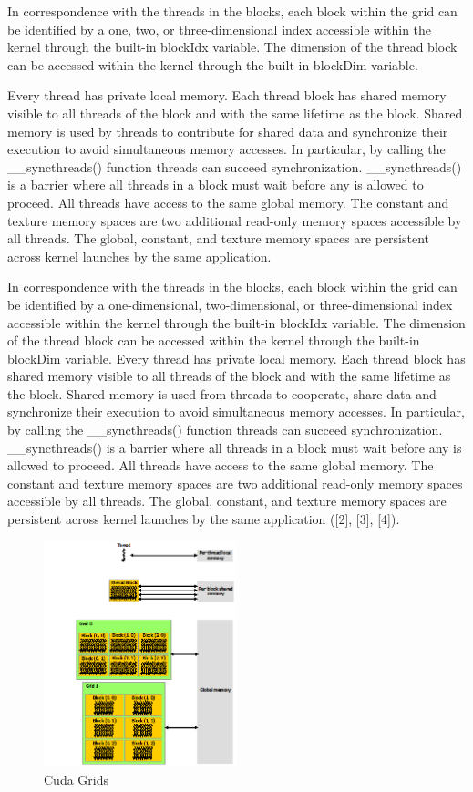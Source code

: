 In correspondence with the threads in the blocks, each block within the grid can be identified by a one, two, or three-dimensional index accessible within the kernel through the built-in blockIdx variable. The dimension of the thread block can be accessed within the kernel through the built-in blockDim variable. 

Every thread has private local memory. Each thread block has shared memory visible to all threads of the block and with the same lifetime as the block. Shared memory is used by threads to contribute for shared data and synchronize their execution to avoid simultaneous memory accesses. In particular, by calling the \_\_syncthreads() function threads can succeed synchronization.  \_\_syncthreads() is a barrier where all threads in a block must wait before any is allowed to proceed. All threads have access to the same global memory. The constant and texture memory spaces are two additional read-only memory spaces accessible by all threads. The global, constant, and texture memory spaces are persistent across kernel launches by the same application. 


In correspondence with the threads in the blocks, each block within the grid can be identified by a one-dimensional, two-dimensional, or three-dimensional index accessible within the kernel through the built-in blockIdx variable. The dimension of the thread block can be accessed within the kernel through the built-in blockDim variable. Every thread has private local memory. Each thread block has shared memory visible to all threads of the block and with the same lifetime as the block. Shared memory is used from threads to cooperate, share data and synchronize their execution to avoid simultaneous memory accesses. In particular, by calling the \_\_syncthreads() function threads can succeed  synchronization. \_\_syncthreads() is a barrier where all threads in a block must wait before any is allowed to proceed. All threads have access to the same global memory. The constant and texture memory spaces are two additional read-only memory spaces accessible by all threads. The global, constant, and texture memory spaces are persistent across kernel launches by the same application ([2], [3], [4]). 

\begin{figure}[H]
   \centering
       \includegraphics[width=0.5\textwidth]{grids}
   \caption{Cuda Grids}
   \label{fig:Grids}
\end{figure}

